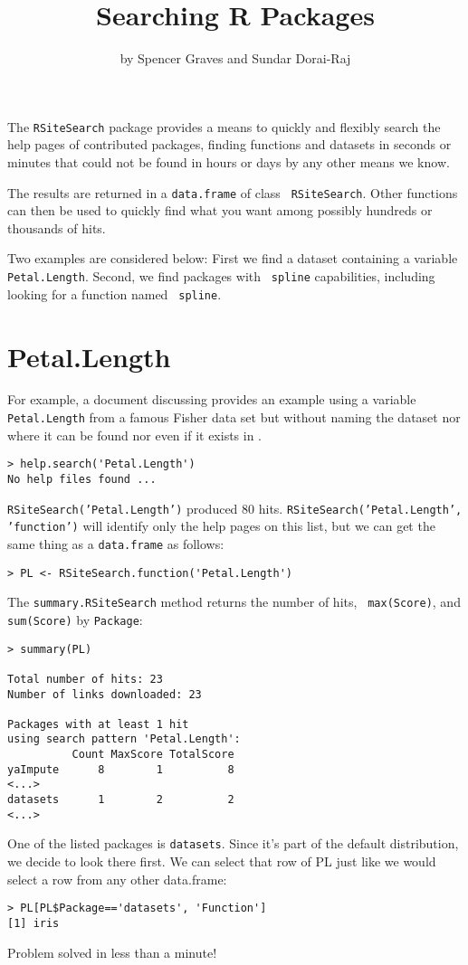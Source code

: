 \title{Searching R Packages}
\author{by Spencer Graves and Sundar Dorai-Raj}

\maketitle

The {\tt RSiteSearch} package provides a means to quickly and
flexibly search the help pages of contributed packages, finding
functions and datasets in seconds or minutes that could not be
found in hours or days by any other means we know.

The results are returned in a {\tt data.frame} of class {\tt
RSiteSearch}.  Other \R{} functions can then be used to quickly find
what you want among possibly hundreds or thousands of hits.

Two examples are considered below:  First we find a dataset containing
a variable {\tt Petal.Length}.  Second, we find packages with {\tt
  spline} capabilities, including looking for a function named {\tt
  spline}.

\section*{Petal.Length}

For example, a document discussing \R{} provides an example using a
variable {\tt Petal.Length} from a famous Fisher data set but without
naming the dataset nor where it can be found nor even if it exists in
\R{}.
\begin{verbatim}
> help.search('Petal.Length')
No help files found ...
\end{verbatim}
{\tt RSiteSearch('Petal.Length')} produced 80 hits.
{\tt RSiteSearch('Petal.Length', 'function')} will identify only
the help pages on this list, but we can get the same thing as a
{\tt data.frame} as follows:
\begin{verbatim}
> PL <- RSiteSearch.function('Petal.Length')
\end{verbatim}
The {\tt summary.RSiteSearch} method returns the number of hits, {\tt
max(Score)}, and {\tt sum(Score)} by {\tt Package}:
\begin{verbatim}
> summary(PL)

Total number of hits: 23
Number of links downloaded: 23

Packages with at least 1 hit
using search pattern 'Petal.Length':
          Count MaxScore TotalScore
yaImpute      8        1          8
<...>
datasets      1        2          2
<...>
\end{verbatim}
One of the listed packages is {\tt datasets}.  Since it's part of the
default \R{} distribution, we decide to look there first.  We can
select that row of PL just like we would select a row from any other
data.frame:
\begin{verbatim}
> PL[PL$Package=='datasets', 'Function']
[1] iris
\end{verbatim}
Problem solved in less than a minute!

